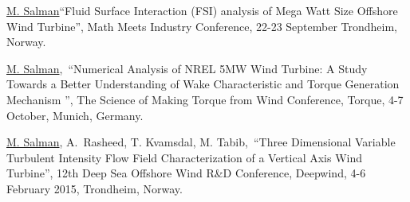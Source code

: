 

\begin{cventries}
	
	\cventry
	{} %
	{} %
	{} %
	{} %
	{
		\begin{cvitems} %
		\item {\underline{M. Salman}“Fluid Surface Interaction (FSI) analysis of Mega Watt Size Offshore Wind Turbine”, Math Meets Industry Conference, 22-23 September Trondheim, Norway.}	
		\item {\underline{M. Salman}, “Numerical Analysis of NREL 5MW Wind Turbine: A Study Towards a Better Understanding of Wake Characteristic and Torque Generation Mechanism ”, The Science of Making Torque from Wind Conference, Torque, 4-7 October, Munich, Germany.}			
		\item {\underline{M. Salman}, A. Rasheed, T.  Kvamsdal, M. Tabib, “Three Dimensional Variable Turbulent Intensity Flow Field Characterization of a Vertical Axis Wind Turbine”, 12th Deep Sea Offshore Wind R\&D Conference, Deepwind, 4-6 February 2015, Trondheim, Norway.}				
		\end{cvitems}
	}
\end{cventries}

